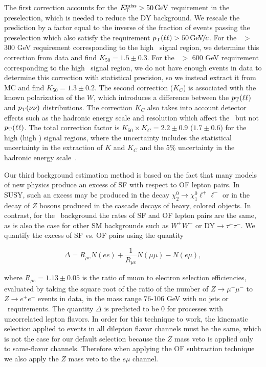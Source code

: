 %
%
The first correction  accounts for the $E_{\mathrm{T}}^{\text{miss}} >  50\,\text{Ge\hspace{-.08em}V}$ requirement in the
preselection, which is needed to  reduce the DY background.  We
rescale  the  prediction by  a  factor equal  to  the  inverse of  the
fraction  of  events  passing  the preselection which  also  satisfy  the
requirement  $p_{\mathrm{T}}(\ell\ell) >  50{\,\text{Ge\hspace{-.08em}V\hspace{-0.16em}/\hspace{-0.08em}}c}$.  
For the \Ht\ $>$ 300 GeV requirement corresponding to the high \MET\ signal region,
we determine this correction from data and find  $K_{50}=1.5 \pm 0.3$.   
For the \Ht\ $>$ 600 GeV requirement corresponding to the high \Ht\ signal region,
we do not have enough events in data to determine this correction with statistical
precision, so we instead extract it from MC and find $K_{50}=1.3 \pm 0.2$.
The  second  correction ($K_C$) is  associated with the  known polarization  of the  $W$, which
introduces a difference  between the $p_{\mathrm{T}}(\ell\ell)$ and $p_{\mathrm{T}}(\nu\nu)$
distributions. The correction $K_C$ also takes into account detector effects such as the hadronic energy
scale and  resolution which affect  the \MET\ but  not $p_{\mathrm{T}}(\ell\ell)$.
The  total correction factor  is $K_{50}  \times K_C  = 2.2  \pm 0.9$ ($1.7 \pm 0.6$) for the
high \MET (high \Ht) signal regions, where the uncertainty includes the statistical uncertainty 
in the extraction of $K$ and $K_C$ and the 5\%  uncertainty in  the hadronic energy scale~\cite{ref:jes}.

Our third background estimation method is based on the fact that many models of new physics
produce an excess of SF with respect to OF lepton pairs. In SUSY, such an excess may be produced
in the decay $\chi_2^0 \to \chi_1^0 \ell^+\ell^-$ or in the decay of $Z$ bosons produced in
the cascade decays of heavy, colored objects. In contrast, for the \ttbar\ background the
rates of SF and OF lepton pairs are the same, as is also the case for other SM backgrounds
such as $W^+W^-$ or DY$\to\tau^+\tau^-$. We quantify the excess of SF vs. OF pairs using the
quantity

\begin{equation}
\label{eq:ofhighpt}
\Delta = R_{\mu e}N(ee) + \frac{1}{R_{\mu e}}N(\mu\mu) - N(e\mu),
\end{equation}

where $R_{\mu e} = 1.13 \pm 0.05$ is the ratio of muon to electron selection efficiencies,
evaluated by taking the square root of the ratio of the number of 
$Z \to \mu^+\mu^-$ to $Z \to e^+e^-$ events in data, in the mass range 76-106 GeV with no jets or 
\met\ requirements. The quantity $\Delta$ is predicted to be 0 for processes with 
uncorrelated lepton flavors. In order for this technique to work, the kinematic selection 
applied to events in all dilepton flavor channels must be the same, which is not the case 
for our default selection because the $Z$ mass veto is applied only to same-flavor channels.
Therefore when applying the OF subtraction technique we also apply the $Z$ mass veto
to the $e\mu$ channel. 

